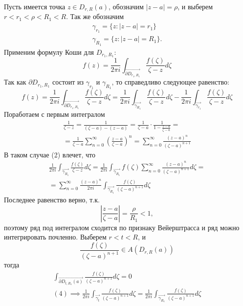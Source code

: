 \documentclass[main]{subfiles}
\begin{document}
\begin{longProof}
    Пусть имеется точка $z \in D_{r, R}(a)$, обозначим $|z-a| = \rho$, и выберем $r < r_1 < \rho < R_1< R$.
    Так же обозначим
    \begin{gather*}
        \gamma_{r_1} = \{z: |z-a| = r_1\} \\
        \gamma_{R_1} = \{z: |z-a| = R_1\}.
    \end{gather*}
    Применим формулу Коши для $D_{r_1, R_1}$:
    \[f(z) = \frac{1}{2 \pi i } \int_{\overrightarrow{\partial D_{r_1, R_1}}} \frac{f(\zeta)}{\zeta - z} d\zeta\]
    Так как $\partial D_{r_1, R_1}$ состоит из $\gamma_{r_1}$ и $\gamma_{R_1}$, то справедливо следующее равенство:
    \[f(z) = \frac{1}{2 \pi i } \int_{\overrightarrow{\partial D_{r_1, R_1}}} \frac{f(\zeta)}{\zeta - z} d\zeta = \frac{1}{2 \pi i } \int_{\overrightarrow{\gamma_{R_1}}} \frac{f(\zeta)}{\zeta - z} d\zeta - \frac{1}{2 \pi i } \int_{\overrightarrow{\gamma_{r_1}}} \frac{f(\zeta)}{\zeta - z} d\zeta \tag{1}\]
    Поработаем с первым интегралом
    \begin{multline*}
        \frac{1}{\zeta - z} = \frac{1}{(\zeta - a) - (z - a)} = \frac{1}{\zeta - a}\cdot \frac{1}{1 - \frac{z - a}{\zeta - a}} = \\
        = \frac{1}{\zeta - a} \sum_{n = 0 }^{\infty} \left(\frac{z - a}{\zeta -a}\right)^n =\sum_{n = 0 }^{\infty} \frac{(z - a)^n}{(\zeta -a)^{n+1}} \tag{2}
    \end{multline*}
    В таком случае (2) влечет, что
    \begin{multline*}
        \frac{1}{2 \pi i} \int_{\overrightarrow{\gamma_{R_1}}} \frac{f(\zeta)}{\zeta - z} d\zeta = \frac{1}{2 \pi i} \int_{\overrightarrow{\gamma_{R_1}}} f(\zeta) \sum_{n = 0 }^{\infty} \frac{(z - a)^n}{(\zeta -a)^{n+1}} d\zeta = \\
        = \sum_{n = 0 }^{\infty} \frac{(z - a)^n}{2 \pi i}  \int_{\overrightarrow{\gamma_{R_1}}} \frac{f(\zeta)}{(\zeta -a)^{n+1}} d\zeta \tag{3}
    \end{multline*}
    Последнее равенство верно, т.к.
    \[\left| \frac{z-a}{\zeta - a} \right| = \frac{\rho}{R_1} < 1,\]
    поэтому ряд под интегралом сходится по признаку Вейерштрасса и ряд можно интегрировать почленно.
    Выберем $r < t < R$, и
    \[\frac{f(\zeta)}{(\zeta - a)^{n+1}} \in A(D_{r,R}(a))\]
    тогда
    \begin{gather*}
        \int_{\overrightarrow{\partial D_{t, R_1} (a)}} \frac{f(\zeta)}{(\zeta -a)^{n+1}} d\zeta = 0  \tag{4}\\
        (4) \implies \frac{1}{2 \pi i}  \int_{\overrightarrow{\gamma_{t}}} \frac{f(\zeta)}{(\zeta -a)^{n+1}} d\zeta =  \frac{1}{2 \pi i}  \int_{\overrightarrow{\gamma_{R_1}}} \frac{f(\zeta)}{(\zeta -a)^{n+1}} d\zeta \tag{5}

\end{gather*}
\end{longProof}
\end{document}
